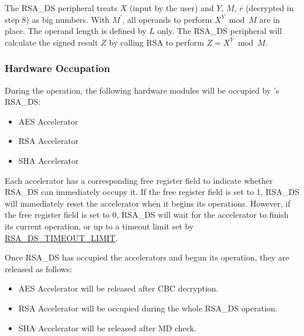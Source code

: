 \documentclass[main\_\_EN.tex]{subfiles}
\begin{document}
\begin{enumerate}
        The RSA\_DS peripheral treats \begin{math}X\end{math} (input by the user) and \begin{math}Y\end{math}, \begin{math}M\end{math}, \begin{math}\overline{r}\end{math} (decrypted in step 8) as big numbers. With \begin{math}M^{\prime}\end{math}, all operands to perform \begin{math} X^{Y} \bmod M\end{math} are in place. The operand length is defined by \begin{math}L\end{math} only. The RSA\_DS peripheral will calculate the signed result \begin{math}Z\end{math} by calling RSA to perform \begin{math}Z = X^{Y} \bmod M\end{math}.

\end{enumerate}

\subsubsection{Hardware Occupation}

During the operation, the following hardware modules will be occupied by \chipname{}'s RSA\_DS:
\begin{itemize}
    \item AES Accelerator
    \item RSA Accelerator
    \item SHA Accelerator
\end{itemize}

Each accelerator has a corresponding free register field to indicate whether RSA\_DS can immediately occupy it. If the free register field is set to 1, RSA\_DS will immediately reset the accelerator when it begins its operations. However, if the free register field is set to 0, RSA\_DS will wait for the accelerator to finish its current operation, or up to a timeout limit set by \hyperref[fielddesc:RSADSTIMEOUTLIMIT]{RSA\_DS\_TIMEOUT\_LIMIT}.

Once RSA\_DS has occupied the accelerators and begun its operation, they are released as follows:
\begin{itemize}
    \item AES Accelerator will be released after CBC decryption.
    \item RSA Accelerator will be occupied during the whole RSA\_DS operation.
    \item SHA Accelerator will be released after MD check.
\end{itemize}
\end{document}
